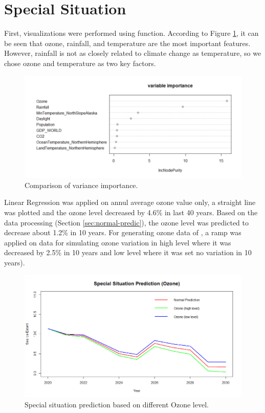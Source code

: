 \section{Special Situation} %
First, visualizations were performed using  function. According to Figure \ref{4.3.2-Variance-Importance}, it can be seen that ozone, rainfall, and temperature are the most important features. However, rainfall is not as closely related to climate change as temperature, so we chose ozone and temperature as two key factors.

\begin{figure}[htbp]
\centering
\includegraphics[width = 1.0\textwidth]{Figure/4.3.2-Variance-Importance.png}
\caption{Comparison of variance importance.}
\label{4.3.2-Variance-Importance}
\end{figure}

Linear Regression was applied on annul average ozone value only, a straight line was plotted and the ozone level decreased by 4.6\% in last 40 years. Based on the  data processing (Section \ref{sec:normal-predic}), the ozone level was predicted to decrease about 1.2\% in 10 years. For generating ozone data of , a ramp was applied on  data for simulating ozone variation in high level where it was decreased by 2.5\% in 10 years and low level where it was set no variation in 10 years).

\begin{figure}[htbp]
\centering
\includegraphics[width = 1.0\textwidth]{Figure/4.3.2-Emergency-Prediction-Ozone.png}
\caption{Special situation prediction based on different Ozone level.}
\label{4.3.2-Emergency-Prediction-Ozone}
\end{figure}

